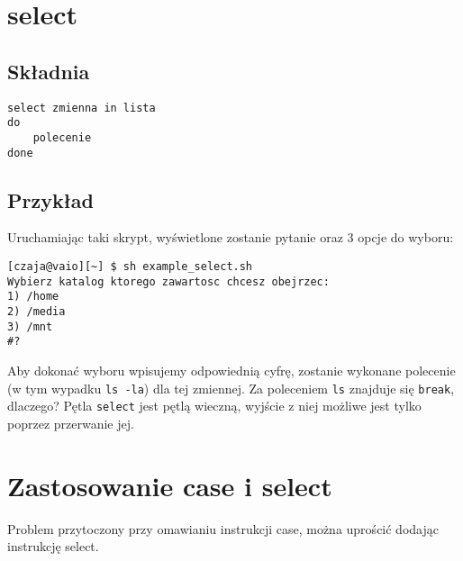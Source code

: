 \documentclass[10 pt, a4paper]{article}
\begin{document}
\section{select}
\subsection{Składnia}

\begin{lstlisting}
select zmienna in lista
do
	polecenie
done
\end{lstlisting}

\subsection{Przykład}


Uruchamiając taki skrypt, wyświetlone zostanie pytanie oraz 3 opcje do wyboru: \newline
\begin{verbatim}
[czaja@vaio][~] $ sh example_select.sh
Wybierz katalog ktorego zawartosc chcesz obejrzec:
1) /home
2) /media
3) /mnt
#?
\end{verbatim}
Aby dokonać wyboru wpisujemy odpowiednią cyfrę, zostanie wykonane polecenie (w tym
wypadku \texttt{ls -la}) dla tej zmiennej. Za poleceniem \texttt{ls} znajduje się \texttt{break}, dlaczego? Pętla \texttt{select} jest pętlą wieczną, wyjście z niej możliwe jest tylko poprzez przerwanie jej.
 
\section{Zastosowanie case i select}
Problem przytoczony przy omawianiu instrukcji case, można uprościć dodając instrukcję select. \newline

\end{document}

